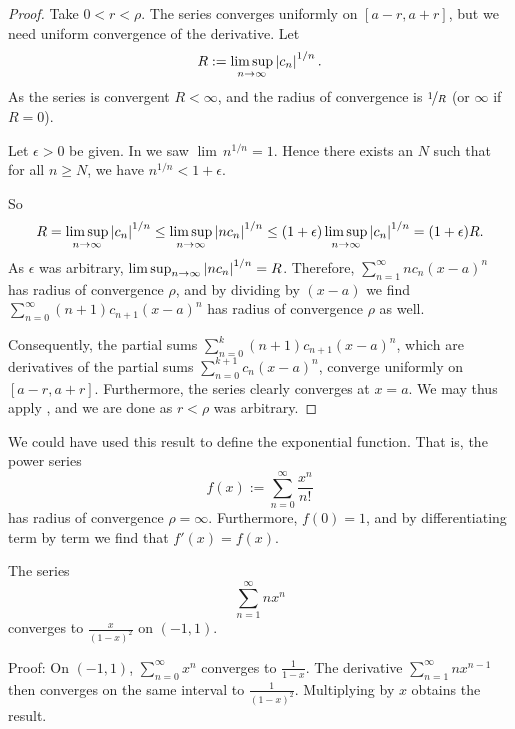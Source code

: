 \begin{proof}
Take $0 < r < \rho$.
The series converges uniformly on
$[a-r,a+r]$,
but we need uniform convergence of the derivative.
Let
\begin{equation*}
R := \limsup_{n \to \infty} \left\lvert {c_n} \right\rvert^{1/n} .
\end{equation*}
As the series is convergent $R < \infty$, and
the radius of convergence is $\nicefrac{1}{R}$ (or $\infty$ if $R=0$).

Let $\epsilon > 0$ be given.  In  
we saw $\lim\,n^{1/n} = 1$.
Hence there exists an $N$ such that for all $n \geq N$, we have
$n^{1/n} < 1+\epsilon$.

So
\begin{equation*}
R = 
\limsup_{n \to \infty}
\left\lvert {c_n} \right\rvert^{1/n}
\leq
\limsup_{n \to \infty}
\left\lvert {n c_n} \right\rvert^{1/n}
\leq
(1+\epsilon)
\limsup_{n \to \infty}
\left\lvert {c_n} \right\rvert^{1/n}
=
(1+\epsilon)R .
\end{equation*}
As $\epsilon$ was arbitrary, $\limsup_{n \to \infty} \left\lvert {n c_n} \right\rvert^{1/n} = R$.
Therefore, $\sum_{n=1}^\infty n c_{n} {(x-a)}^{n}$ has radius of
convergence $\rho$, and by dividing by $(x-a)$ we find
$\sum_{n=0}^\infty (n+1) c_{n+1} {(x-a)}^{n}$ has radius of convergence
$\rho$ as well.

Consequently, the partial sums 
$\sum_{n=0}^k (n+1) c_{n+1} {(x-a)}^{n}$,
which are derivatives of the partial sums
$\sum_{n=0}^{k+1} c_{n} {(x-a)}^{n}$,
converge uniformly on $[a-r,a+r]$.  Furthermore,
the series clearly converges at $x=a$.
We may thus apply , and
we are done as $r < \rho$ was arbitrary.
\end{proof}

\begin{example} \label{example:exponentialbypowerseries}
We could have used this result to define the exponential function.  That is,
the power series
\begin{equation*}
f(x) := \sum_{n=0}^\infty \frac{x^n}{n!}
\end{equation*}
has radius of convergence $\rho=\infty$.  Furthermore,
$f(0) = 1$, and by differentiating
term by term we find that $f'(x) = f(x)$.
\end{example}

\begin{example}
The series
\begin{equation*}
\sum_{n=1}^\infty n x^n
\end{equation*}
converges to $\frac{x}{{(1-x)}^2}$ on $(-1,1)$.

Proof:
On $(-1,1)$, $\sum_{n=0}^\infty x^n$ converges to
$\frac{1}{1-x}$.  The derivative $\sum_{n=1}^\infty n x^{n-1}$ then converges
on the same interval to $\frac{1}{{(1-x)}^2}$.  Multiplying by $x$
obtains the result.
\end{example}

